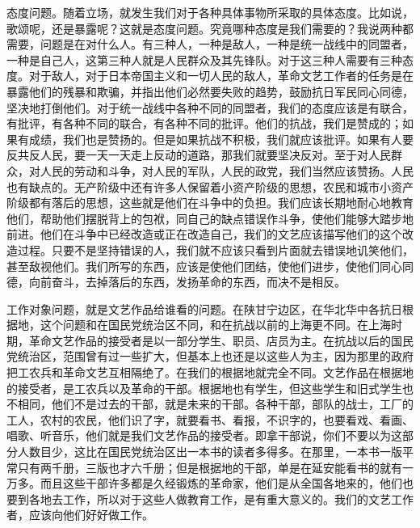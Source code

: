 态度问题。随着立场，就发生我们对于各种具体事物所采取的具体态度。比如说，歌颂呢，还是暴露呢？这就是态度问题。究竟哪种态度是我们需要的？我说两种都需要，问题是在对什么人。有三种人，一种是敌人，一种是统一战线中的同盟者，一种是自己人，这第三种人就是人民群众及其先锋队。对于这三种人需要有三种态度。对于敌人，对于日本帝国主义和一切人民的敌人，革命文艺工作者的任务是在暴露他们的残暴和欺骗，并指出他们必然要失败的趋势，鼓励抗日军民同心同德，坚决地打倒他们。对于统一战线中各种不同的同盟者，我们的态度应该是有联合，有批评，有各种不同的联合，有各种不同的批评。他们的抗战，我们是赞成的；如果有成绩，我们也是赞扬的。但是如果抗战不积极，我们就应该批评。如果有人要反共反人民，要一天一天走上反动的道路，那我们就要坚决反对。至于对人民群众，对人民的劳动和斗争，对人民的军队，人民的政党，我们当然应该赞扬。人民也有缺点的。无产阶级中还有许多人保留着小资产阶级的思想，农民和城市小资产阶级都有落后的思想，这些就是他们在斗争中的负担。我们应该长期地耐心地教育他们，帮助他们摆脱背上的包袱，同自己的缺点错误作斗争，使他们能够大踏步地前进。他们在斗争中已经改造或正在改造自己，我们的文艺应该描写他们的这个改造过程。只要不是坚持错误的人，我们就不应该只看到片面就去错误地讥笑他们，甚至敌视他们。我们所写的东西，应该是使他们团结，使他们进步，使他们同心同德，向前奋斗，去掉落后的东西，发扬革命的东西，而决不是相反。

工作对象问题，就是文艺作品给谁看的问题。在陕甘宁边区，在华北华中各抗日根据地，这个问题和在国民党统治区不同，和在抗战以前的上海更不同。在上海时期，革命文艺作品的接受者是以一部分学生、职员、店员为主。在抗战以后的国民党统治区，范围曾有过一些扩大，但基本上也还是以这些人为主，因为那里的政府把工农兵和革命文艺互相隔绝了。在我们的根据地就完全不同。文艺作品在根据地的接受者，是工农兵以及革命的干部。根据地也有学生，但这些学生和旧式学生也不相同，他们不是过去的干部，就是未来的干部。各种干部，部队的战士，工厂的工人，农村的农民，他们识了字，就要看书、看报，不识字的，也要看戏、看画、唱歌、听音乐，他们就是我们文艺作品的接受者。即拿干部说，你们不要以为这部分人数目少，这比在国民党统治区出一本书的读者多得多。在那里，一本书一版平常只有两千册，三版也才六千册；但是根据地的干部，单是在延安能看书的就有一万多。而且这些干部许多都是久经锻炼的革命家，他们是从全国各地来的，他们也要到各地去工作，所以对于这些人做教育工作，是有重大意义的。我们的文艺工作者，应该向他们好好做工作。

